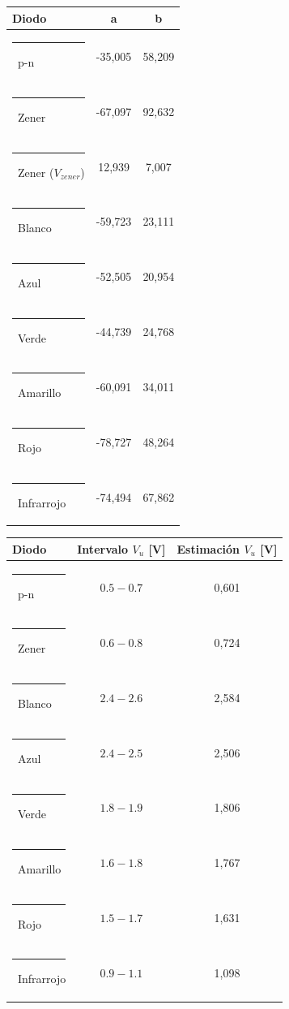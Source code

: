 \documentclass[10pt,a4paper]{article}
\begin{document}
\noindent
\begin{minipage}[t]{0.48\linewidth}
  \vspace{0pt}\centering\footnotesize
  \renewcommand{\arraystretch}{1.12}
  \begin{tabular}{@{}l c c@{}}
    \toprule
    Diodo & a & b\\
    \midrule
    {\color{cPN}\rule{1.2ex}{1.2ex}}\ p-n & -35,005 & 58,209\\
    {\color{cZener}\rule{1.2ex}{1.2ex}}\ Zener & -67,097 & 92,632\\
    {\color{cZener}\rule{1.2ex}{1.2ex}}\ Zener ($V_{zener}$) & 12,939 & 7,007\\
    {\color{cBlancoM}\rule{1.2ex}{1.2ex}}\ Blanco & -59,723 & 23,111\\
    {\color{cAzul}\rule{1.2ex}{1.2ex}}\ Azul & -52,505 & 20,954\\
    {\color{cVerde}\rule{1.2ex}{1.2ex}}\ Verde & -44,739 & 24,768\\
    {\color{cAmarillo}\rule{1.2ex}{1.2ex}}\ Amarillo & -60,091 & 34,011\\
    {\color{cRojo}\rule{1.2ex}{1.2ex}}\ Rojo & -78,727 & 48,264\\
    {\color{cUV}\rule{1.2ex}{1.2ex}}\ Infrarrojo & -74,494 & 67,862\\
    \bottomrule
  \end{tabular}
  \label{tab:coef}
\end{minipage}\hfill
\begin{minipage}[t]{0.48\linewidth}
  \vspace{0pt}\centering\footnotesize
  \renewcommand{\arraystretch}{1.12}
  \begin{tabular}{@{}l c c@{}}
    \toprule
    Diodo & Intervalo $V_{u}$ [V] & Estimación $V_u$ [V]\\
    \midrule
    {\color{cPN}\rule{1.2ex}{1.2ex}}\ p-n & $0.5-0.7$ & 0,601\\
    {\color{cZener}\rule{1.2ex}{1.2ex}}\ Zener & $0.6-0.8$ & 0,724\\
    {\color{cBlancoM}\rule{1.2ex}{1.2ex}}\ Blanco & $2.4-2.6$ & 2,584\\
    {\color{cAzul}\rule{1.2ex}{1.2ex}}\ Azul & $2.4-2.5$ & 2,506\\
    {\color{cVerde}\rule{1.2ex}{1.2ex}}\ Verde & $1.8-1.9$ & 1,806\\
    {\color{cAmarillo}\rule{1.2ex}{1.2ex}}\ Amarillo & $1.6-1.8$ & 1,767\\
    {\color{cRojo}\rule{1.2ex}{1.2ex}}\ Rojo & $1.5-1.7$ & 1,631\\
    {\color{cUV}\rule{1.2ex}{1.2ex}}\ Infrarrojo & $0.9-1.1$ & 1,098\\
    \bottomrule
  \end{tabular}
  \label{tab:umbrales}
\end{minipage}
\end{document}
